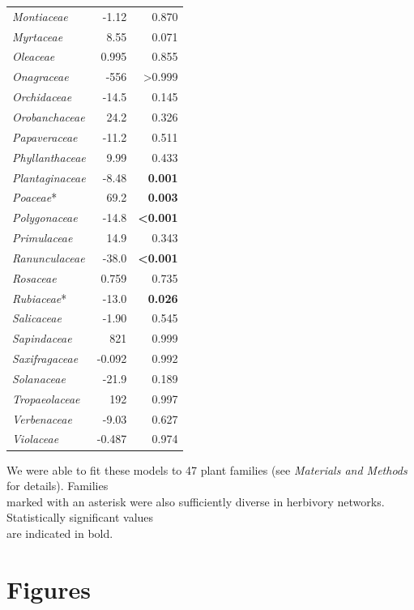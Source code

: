\documentclass[12pt]{article}
\begin{document}
\begin{table}[!h]
\begin{tabular}{|l  rr|}
    \emph{Montiaceae} &  -1.12  & 0.870 \\
    \emph{Myrtaceae} &  8.55 & 0.071 \\
    \emph{Oleaceae} &  0.995 & 0.855 \\
    \emph{Onagraceae} &  -556  & \textgreater0.999 \\
    \emph{Orchidaceae} &  -14.5 & 0.145 \\
    \emph{Orobanchaceae} &  24.2  & 0.326 \\
    \emph{Papaveraceae} &  -11.2 & 0.511 \\
    \emph{Phyllanthaceae} &  9.99 & 0.433 \\
    \emph{Plantaginaceae} &  -8.48  & \textbf{0.001} \\
    \emph{Poaceae}* &  69.2  & \textbf{0.003} \\
    \emph{Polygonaceae} &  -14.8 & \textbf{\textless0.001} \\
    \emph{Primulaceae} &  14.9  & 0.343 \\
    \emph{Ranunculaceae} &  -38.0 & \textbf{\textless0.001} \\
    \emph{Rosaceae} &  0.759 & 0.735 \\
    \emph{Rubiaceae}* &  -13.0 & \textbf{0.026} \\
    \emph{Salicaceae} &  -1.90  & 0.545 \\
    \emph{Sapindaceae} &  821 & 0.999 \\
    \emph{Saxifragaceae} &  -0.092  & 0.992 \\
    \emph{Solanaceae} &  -21.9 & 0.189 \\
    \emph{Tropaeolaceae} &  192 & 0.997 \\
    \emph{Verbenaceae} &  -9.03  & 0.627 \\
    \emph{Violaceae} &  -0.487  & 0.974 \\
  \hline
  \end{tabular}
  \smallskip
  \footnotesize

    We were able to fit these models to 47 plant families (see \emph{Materials and Methods} for     details). 
    Families \\ marked with an asterisk were also sufficiently diverse in herbivory networks. 
    Statistically significant values \\ are indicated in bold. 

    \end{table}

\clearpage

\section*{Figures}
\end{document}
